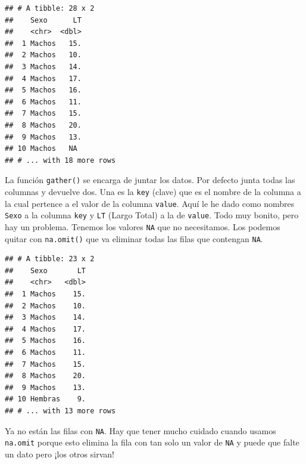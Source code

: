 \documentclass[]{book}
\newenvironment{Shaded}{\begin{snugshade}}{\end{snugshade}}
\newcommand{\DataTypeTok}[1]{\textcolor[rgb]{0.13,0.29,0.53}{#1}}
\newcommand{\KeywordTok}[1]{\textcolor[rgb]{0.13,0.29,0.53}{\textbf{#1}}}
\newcommand{\NormalTok}[1]{#1}
\newcommand{\OperatorTok}[1]{\textcolor[rgb]{0.81,0.36,0.00}{\textbf{#1}}}
\newcommand{\StringTok}[1]{\textcolor[rgb]{0.31,0.60,0.02}{#1}}
\theoremstyle{definition}
\theoremstyle{definition}
\theoremstyle{definition}
\theoremstyle{remark}
\begin{document}
\begin{Shaded}
\end{Shaded}

\begin{verbatim}
## # A tibble: 28 x 2
##    Sexo      LT
##    <chr>  <dbl>
##  1 Machos   15.
##  2 Machos   10.
##  3 Machos   14.
##  4 Machos   17.
##  5 Machos   16.
##  6 Machos   11.
##  7 Machos   15.
##  8 Machos   20.
##  9 Machos   13.
## 10 Machos   NA 
## # ... with 18 more rows
\end{verbatim}

La función \texttt{gather()} se encarga de juntar los datos. Por defecto
junta todas las columnas y devuelve dos. Una es la \texttt{key} (clave)
que es el nombre de la columna a la cual pertence a el valor de la
columna \texttt{value}. Aquí le he dado como nombres \texttt{Sexo} a la
columna \texttt{key} y \texttt{LT} (Largo Total) a la de \texttt{value}.
Todo muy bonito, pero hay un problema. Tenemos los valores \texttt{NA}
que no necesitamos. Los podemos quitar con \texttt{na.omit()} que va
eliminar todas las filas que contengan \texttt{NA}.

\begin{Shaded}
\end{Shaded}

\begin{verbatim}
## # A tibble: 23 x 2
##    Sexo       LT
##    <chr>   <dbl>
##  1 Machos    15.
##  2 Machos    10.
##  3 Machos    14.
##  4 Machos    17.
##  5 Machos    16.
##  6 Machos    11.
##  7 Machos    15.
##  8 Machos    20.
##  9 Machos    13.
## 10 Hembras    9.
## # ... with 13 more rows
\end{verbatim}

Ya no están las filas con \texttt{NA}. Hay que tener mucho cuidado
cuando usamos \texttt{na.omit} porque esto elimina la fila con tan solo
un valor de \texttt{NA} y puede que falte un dato pero ¡los otros
sirvan!
\end{document}
